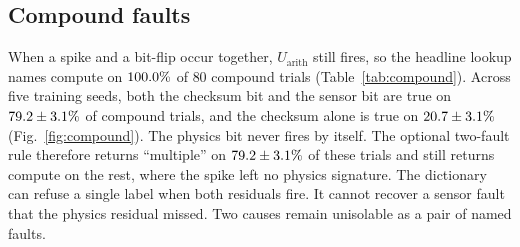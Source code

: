 \documentclass{ieeeaccess}
\begin{document}
\begin{table}[t]
\caption{Headline results (percent, mean $\pm$ standard deviation over five training seeds). A dash means that output is not produced. Flag novel and flag compute are undifferentiated anomaly marks.}
\label{tab:summary}
\centering
\footnotesize
\setlength{\tabcolsep}{3pt}
\end{table}

\subsection{Compound faults}

When a spike and a bit-flip occur together, $U_{\mathrm{arith}}$ still fires, so the headline lookup names compute on $100.0\%$ of $80$ compound trials (Table~\ref{tab:compound}). Across five training seeds, both the checksum bit and the sensor bit are true on $79.2\pm3.1\%$ of compound trials, and the checksum alone is true on $20.7\pm3.1\%$ (Fig.~\ref{fig:compound}). The physics bit never fires by itself. The optional two-fault rule therefore returns ``multiple'' on $79.2\pm3.1\%$ of these trials and still returns compute on the rest, where the spike left no physics signature. The dictionary can refuse a single label when both residuals fire. It cannot recover a sensor fault that the physics residual missed. Two causes remain unisolable as a pair of named faults.
\end{document}
